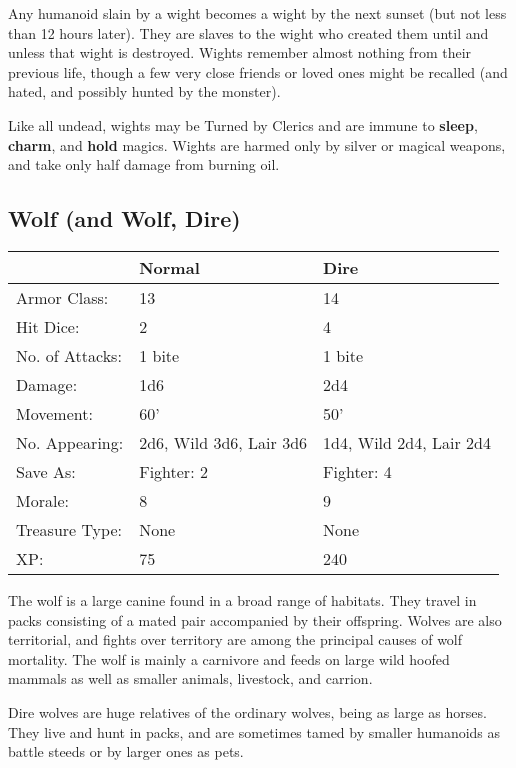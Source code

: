 \documentclass[a4paper,twoside,openany,10pt]{book}
\begin{document}
\begin{multicols}{2}
Any humanoid slain by a wight becomes a wight by the next sunset (but not less than 12 hours later). They are slaves to the wight who created them until and unless that wight is destroyed. Wights remember almost nothing from their previous life, though a few very close friends or loved ones might be recalled (and hated, and possibly hunted by the monster).

Like all undead, wights may be Turned by Clerics and are immune to \textbf{sleep}, \textbf{charm},\textbf{ }and \textbf{hold} magics. Wights are harmed only by silver or magical weapons, and take only half damage from burning oil.



\subsection*{Wolf (and Wolf, Dire)}\label{wolf-and-wolf-dire}

\begin{tabularx}{0.50\textwidth}{@{}lXX@{}}
& Normal & Dire \\\hline
Armor Class: & 13 & 14 \\\hline
Hit Dice: & 2 & 4 \\\hline
No. of Attacks: & 1 bite & 1 bite \\\hline
Damage: & 1d6 & 2d4 \\\hline
Movement: & 60' & 50' \\\hline
No. Appearing: & 2d6, Wild 3d6, Lair 3d6 & 1d4, Wild 2d4, Lair 2d4 \\\hline
Save As: & Fighter: 2 & Fighter: 4 \\\hline
Morale: & 8 & 9 \\\hline
Treasure Type: & None & None \\\hline
XP: & 75 & 240 \\\hline
\end{tabularx}\medskip

The wolf is a large canine found in a broad range of habitats. They travel in packs consisting of a mated pair accompanied by their offspring. Wolves are also territorial, and fights over territory are among the principal causes of wolf mortality. The wolf is mainly a carnivore and feeds on large wild hoofed mammals as well as smaller animals, livestock, and carrion.

Dire wolves are huge relatives of the ordinary wolves, being as large as horses. They live and hunt in packs, and are sometimes tamed by smaller humanoids as battle steeds or by larger ones as pets.


\end{multicols}
\end{document}
